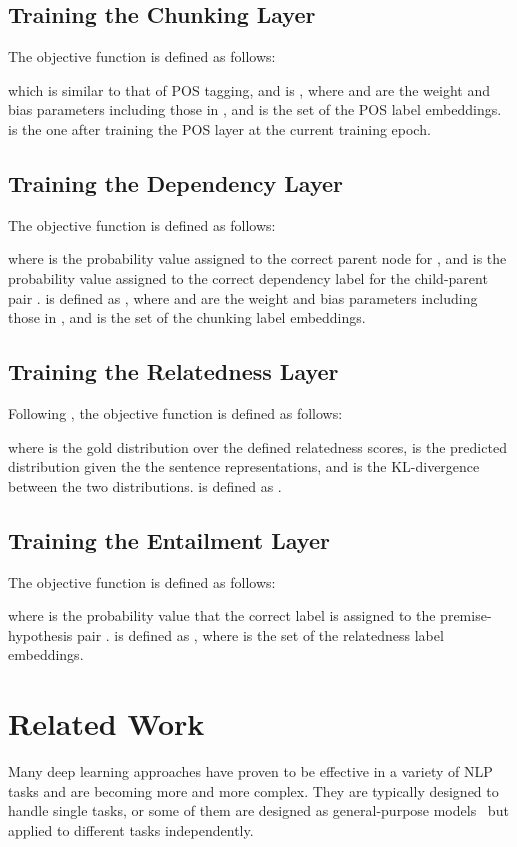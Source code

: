 \documentclass[11pt,a4paper]{article}
\begin{document}
\subsection{Training the Chunking Layer}
\label{subsec:trainingChunking}
The objective function is defined as follows:

which is similar to that of POS tagging, and  is , where  and  are the weight and bias parameters including those in , and  is the set of the POS label embeddings.
 is the one after training the POS layer at the current training epoch.


\subsection{Training the Dependency Layer}
The objective function is defined as follows:

where  is the probability value assigned to the correct parent node  for , and  is the probability value assigned to the correct dependency label  for the child-parent pair .
 is defined as , where  and  are the weight and bias parameters including those in , and  is the set of the chunking label embeddings.


\subsection{Training the Relatedness Layer}
Following \citet{tai2015treelstm}, the objective function is defined as follows:

where  is the gold distribution over the defined relatedness scores,  is the predicted distribution given the the sentence representations, and  is the KL-divergence between the two distributions.
 is defined as .


\subsection{Training the Entailment Layer}
The objective function is defined as follows:

where  is the probability value that the correct label  is assigned to the premise-hypothesis pair .
 is defined as , where  is the set of the relatedness label embeddings.



\section{Related Work}
Many deep learning approaches have proven to be effective in a variety of NLP tasks and are becoming more and more complex.
They are typically designed to handle single tasks, or some of them are designed as general-purpose models~\citep{kumar2016dmn,sutskever2014seq2seq} but applied to different tasks independently.
\end{document}
